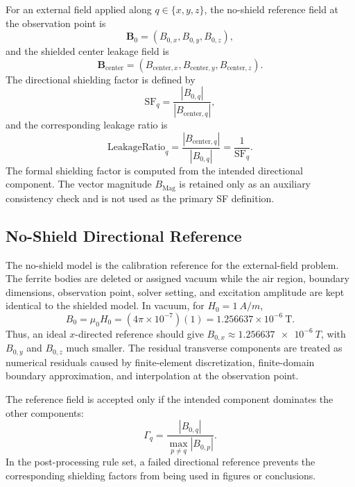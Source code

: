 ﻿\documentclass[letterpaper,journal]{IEEEtran}
\begin{document}
For an external field applied along $q\in\{x,y,z\}$, the no-shield reference field at the observation point is
\begin{equation}
\mathbf{B}_0=(B_{0,x},B_{0,y},B_{0,z}),
\label{eq:B0}
\end{equation}
and the shielded center leakage field is
\begin{equation}
\mathbf{B}_{\mathrm{center}}=(B_{\mathrm{center},x},B_{\mathrm{center},y},B_{\mathrm{center},z}).
\label{eq:Bcenter}
\end{equation}
The directional shielding factor is defined by
\begin{equation}
\mathrm{SF}_q=\frac{|B_{0,q}|}{|B_{\mathrm{center},q}|},
\label{eq:sfq}
\end{equation}
and the corresponding leakage ratio is
\begin{equation}
\mathrm{LeakageRatio}_q=\frac{|B_{\mathrm{center},q}|}{|B_{0,q}|}=\frac{1}{\mathrm{SF}_q}.
\label{eq:leakage}
\end{equation}
The formal shielding factor is computed from the intended directional component. The vector magnitude $B_{\mathrm{Mag}}$ is retained only as an auxiliary consistency check and is not used as the primary SF definition.

\subsection{No-Shield Directional Reference}

The no-shield model is the calibration reference for the external-field problem. The ferrite bodies are deleted or assigned vacuum while the air region, boundary dimensions, observation point, solver setting, and excitation amplitude are kept identical to the shielded model. In vacuum, for $H_0=\SI{1}{A/m}$,
\begin{equation}
B_0=\mu_0 H_0=(4\pi\times10^{-7})(1)=1.256637\times10^{-6}\ \mathrm{T}.
\label{eq:vacuum}
\end{equation}
Thus, an ideal $x$-directed reference should give $B_{0,x}\approx\SI{1.256637e-6}{T}$, with $B_{0,y}$ and $B_{0,z}$ much smaller. The residual transverse components are treated as numerical residuals caused by finite-element discretization, finite-domain boundary approximation, and interpolation at the observation point.

The reference field is accepted only if the intended component dominates the other components:
\begin{equation}
\Gamma_q=\frac{|B_{0,q}|}{\max_{p\ne q}|B_{0,p}|}.
\label{eq:purity}
\end{equation}
In the post-processing rule set, a failed directional reference prevents the corresponding shielding factors from being used in figures or conclusions.
\end{document}
